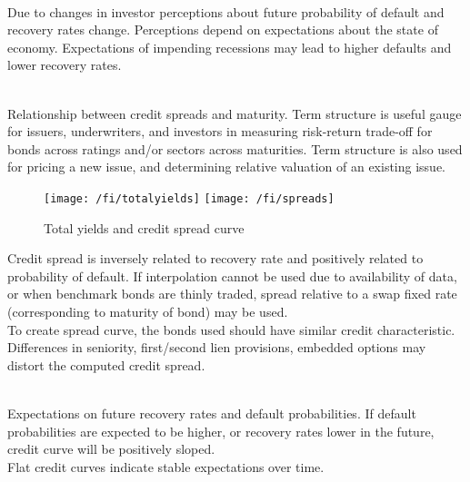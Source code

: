 \begin{remark} \\
Due to changes in investor perceptions about future probability of default and recovery rates change. Perceptions depend on expectations about the state of economy. Expectations of impending recessions may lead to higher defaults and lower recovery rates.
\end{remark}

\begin{definition} \\
Relationship between credit spreads and maturity. Term structure is useful gauge for issuers, underwriters, and investors in measuring risk-return trade-off for bonds across ratings and/or sectors across maturities. Term structure is also used for pricing a new issue, and determining relative valuation of an existing issue.
\end{definition}

\begin{figure}[H]
\centering
\texttt{[image: /fi/totalyields]}
\texttt{[image: /fi/spreads]}
\caption{Total yields and credit spread curve}
\end{figure}

\begin{remark} 
Credit spread is inversely related to recovery rate and positively related to probability of default. If interpolation cannot be used due to availability of data, or when benchmark bonds are thinly traded,  spread relative to a swap fixed rate (corresponding to maturity of bond) may be used.\\
To create spread curve, the bonds used should have similar credit characteristic.\\
Differences in seniority, first/second lien provisions, embedded options may distort the computed credit spread.
\end{remark}

\begin{remark} \\
Expectations on future recovery rates and default probabilities. If default probabilities are expected to be higher, or recovery rates lower in the future, credit curve will be positively sloped.\\
Flat credit curves indicate stable expectations over time.
\end{remark}

